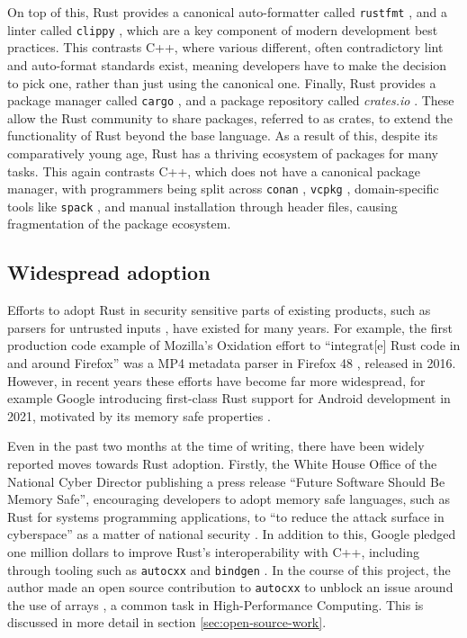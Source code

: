 On top of this, Rust provides a canonical auto-formatter called \texttt{rustfmt} \cite{RustlangRustfmt2024}, and a linter called \texttt{clippy} \cite{RustlangRustclippy2024}, which are a key component of modern development best practices. This contrasts C++, where various different, often contradictory lint and auto-format standards exist, meaning developers have to make the decision to pick one, rather than just using the canonical one. Finally, Rust provides a package manager called \texttt{cargo} \cite{RustlangCargo2024}, and a package repository called \textit{crates.io} \cite{CratesIoRust}. These allow the Rust community to share packages, referred to as crates, to extend the functionality of Rust beyond the base language. As a result of this, despite its comparatively young age, Rust has a thriving ecosystem of packages for many tasks. This again contrasts C++, which does not have a canonical package manager, with programmers being split across \texttt{conan} \cite{ConanioConan2024}, \texttt{vcpkg} \cite{MicrosoftVcpkg2024}, domain-specific tools like \texttt{spack} \cite{gamblin2015spack}, and manual installation through header files, causing fragmentation of the package ecosystem.

\subsection{Widespread adoption}
\label{ssec:rust-adoption}

Efforts to adopt Rust in security sensitive parts of existing products, such as parsers for untrusted inputs \cite{OxidationMozillaWiki}, have existed for many years. For example, the first production code example of Mozilla's Oxidation effort to ``integrat[e] Rust code in and around Firefox'' was a MP4 metadata parser in Firefox 48 \cite{OxidationMozillaWiki}, released in 2016. However, in recent years these efforts have become far more widespread, for example Google introducing first-class Rust support for Android development in 2021, motivated by its memory safe properties \cite{RustAndroidPlatform}.

Even in the past two months at the time of writing, there have been widely reported moves towards Rust adoption. Firstly, the White House Office of the National Cyber Director publishing a press release ``Future Software Should Be Memory Safe'', encouraging developers to adopt memory safe languages, such as Rust for systems programming applications, to ``to reduce the attack surface in cyberspace'' as a matter of national security \cite{PressReleaseFuture2024}. In addition to this, Google pledged one million dollars to improve Rust's interoperability with C++, including through tooling such as \texttt{autocxx} \cite{GoogleAutocxx2024} and \texttt{bindgen} \cite{RustlangRustbindgen2024}. In the course of this project, the author made an open source contribution to \texttt{autocxx} to unblock an issue around the use of arrays \cite{goodmanAddIntegrationTests}, a common task in High-Performance Computing. This is discussed in more detail in section \ref{sec:open-source-work}.






